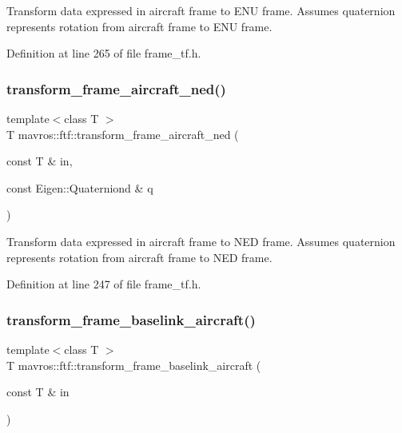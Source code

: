 Transform data expressed in aircraft frame to E\+NU frame. Assumes quaternion represents rotation from aircraft frame to E\+NU frame. 



Definition at line 265 of file frame\+\_\+tf.\+h.

\mbox{\label{group__nodelib_gaabef5de6c7b391794c35c75dd1232194}} 
\subsubsection{\texorpdfstring{transform\_frame\_aircraft\_ned()}{transform\_frame\_aircraft\_ned()}}
{\footnotesize\ttfamily template$<$class T $>$ \\
T mavros\+::ftf\+::transform\+\_\+frame\+\_\+aircraft\+\_\+ned (\begin{DoxyParamCaption}\item[{const T \&}]{in,  }\item[{const Eigen\+::\+Quaterniond \&}]{q }\end{DoxyParamCaption})\hspace{0.3cm}{\ttfamily [inline]}}



Transform data expressed in aircraft frame to N\+ED frame. Assumes quaternion represents rotation from aircraft frame to N\+ED frame. 



Definition at line 247 of file frame\+\_\+tf.\+h.

\mbox{\label{group__nodelib_ga8e8a38a1f75dd0007204a206a6745193}} 
\subsubsection{\texorpdfstring{transform\_frame\_baselink\_aircraft()}{transform\_frame\_baselink\_aircraft()}}
{\footnotesize\ttfamily template$<$class T $>$ \\
T mavros\+::ftf\+::transform\+\_\+frame\+\_\+baselink\+\_\+aircraft (\begin{DoxyParamCaption}\item[{const T \&}]{in }\end{DoxyParamCaption})\hspace{0.3cm}{\ttfamily [inline]}}



